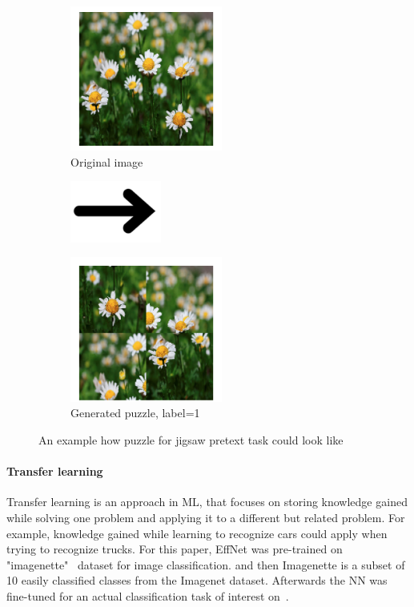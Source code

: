 \\
\begin{figure}[h]
    \begin{subfigure}{0.33\textwidth}
        \caption{Original image}
        \includegraphics[width=5cm]{images/dandelion}
    \end{subfigure}
    \begin{subfigure}{0.2\textwidth}
        \includegraphics[width=3cm]{images/arrow}
    \end{subfigure}
    \begin{subfigure}{0.33\textwidth}
        \caption{Generated puzzle, label=1}
        \includegraphics[width=5cm]{images/puzzle}
    \end{subfigure}
    \caption{An example how puzzle for jigsaw pretext task could look like}
    \label{fig:jig-fig}
\end{figure}


\paragraph{Transfer learning}
Transfer learning is an approach in ML, that focuses on storing knowledge gained while solving one problem and applying it to a different but related problem.
For example, knowledge gained while learning to recognize cars could apply when trying to recognize trucks.
For this paper, EffNet was pre-trained on "imagenette"~\cite{ImageNette} dataset for image classification. and then
Imagenette is a subset of 10 easily classified classes from the Imagenet dataset.
Afterwards the NN was fine-tuned for an actual classification task of interest on~\cite{tfflowers}.

